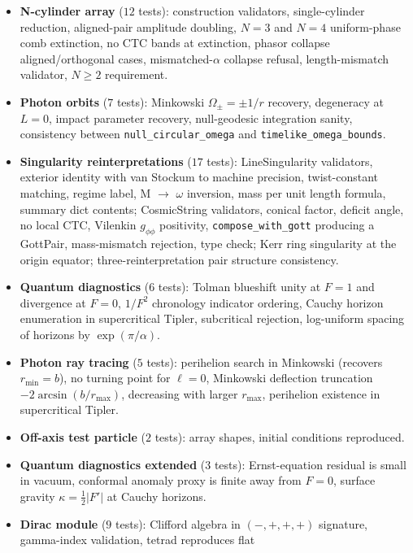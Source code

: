 \documentclass[11pt,a4paper]{article}
\begin{document}
\begin{itemize}[leftmargin=*]
$r > 0$, equatorial CTC interval $(r_{\rm CTC}, 0)$, threshold solving
the cubic $r^3 + a^2 r + 2 M a^2 = 0$, finite metric components.
\item \textbf{N-cylinder array} ($12$ tests): construction validators,
single-cylinder reduction, aligned-pair amplitude doubling,
$N = 3$ and $N = 4$ uniform-phase comb extinction, no CTC bands at
extinction, phasor collapse aligned/orthogonal cases, mismatched-$\alpha$
collapse refusal, length-mismatch validator, $N \ge 2$ requirement.
\item \textbf{Photon orbits} ($7$ tests): Minkowski $\Omega_\pm = \pm 1/r$
recovery, degeneracy at $L = 0$, impact parameter recovery,
null-geodesic integration sanity, consistency between
\texttt{null\_circular\_omega} and \texttt{timelike\_omega\_bounds}.
\item \textbf{Singularity reinterpretations} ($17$ tests):
LineSingularity validators, exterior identity with van Stockum to
machine precision, twist-constant matching, regime label, M $\to$
$\omega$ inversion, mass per unit length formula, summary dict
contents; CosmicString validators, conical factor, deficit angle, no
local CTC, Vilenkin $g_{\phi\phi}$ positivity,
\texttt{compose\_with\_gott} producing a GottPair, mass-mismatch
rejection, type check; Kerr ring singularity at the origin equator;
three-reinterpretation pair structure consistency.
\item \textbf{Quantum diagnostics} ($6$ tests): Tolman blueshift unity at
$F = 1$ and divergence at $F = 0$, $1/F^2$ chronology indicator
ordering, Cauchy horizon enumeration in supercritical Tipler,
subcritical rejection, log-uniform spacing of horizons by
$\exp(\pi/\alpha)$.
\item \textbf{Photon ray tracing} ($5$ tests): perihelion search in
Minkowski (recovers $r_{\min} = b$), no turning point for $\ell = 0$,
Minkowski deflection truncation $-2 \arcsin(b/r_{\max})$, decreasing
with larger $r_{\max}$, perihelion existence in supercritical Tipler.
\item \textbf{Off-axis test particle} ($2$ tests): array shapes,
initial conditions reproduced.
\item \textbf{Quantum diagnostics extended} ($3$ tests): Ernst-equation
residual is small in vacuum, conformal anomaly proxy is finite away
from $F = 0$, surface gravity $\kappa = \tfrac{1}{2}\lvert F'\rvert$
at Cauchy horizons.
\item \textbf{Dirac module} ($9$ tests): Clifford algebra in
$(-,+,+,+)$ signature, gamma-index validation, tetrad reproduces flat

\end{itemize}
\end{document}
